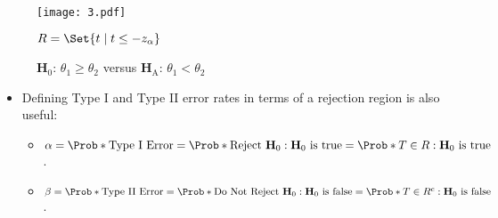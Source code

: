 \begin{figure}[!htbp]
    \centering
    \texttt{[image: 3.pdf]}
    \caption{$ \mathbf{H}_0 $: $ \theta_1\ge\theta_2 $ versus $ \mathbf{H}_\text{A} $: $ \theta_1<\theta_2 $}{$ \mathcal{R}=\Set{t\mid t\le -z_{\alpha}} $}
\end{figure}
\begin{itemize}
    \item Defining Type I and Type II error rates in terms of a rejection region is also useful:
          \begin{itemize}
              \item $ \alpha=\Prob*{\text{Type I Error}}=\Prob*{\text{Reject $ \mathbf{H}_0 $}\given \text{$ \mathbf{H}_0 $ is true}}=\Prob*{T\in\mathcal{R}\given \text{$ \mathbf{H}_0 $ is true}} $.
              \item $ \beta=\Prob*{\text{Type II Error}}=\Prob*{\text{Do Not Reject $ \mathbf{H}_0 $}\given \text{$ \mathbf{H}_0 $ is false}}=\Prob*{T\in\mathcal{R}^c\given \text{$ \mathbf{H}_0 $ is false}} $.
          \end{itemize}
\end{itemize}
